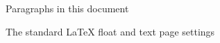 \documentclass[12pt]{article}
\begin{document}
\begin{preview}



\end{preview}


\begin{preview}



\end{preview}


\begin{preview}



\end{preview}


\begin{preview}
    


\end{preview}

\begin{preview}
	
	\currentparagraph
	\begin{figure}
		\paragraphdesign
		\caption{Paragraphs in this document}\label{fig:dpara}
	\end{figure}
	
\end{preview}

\begin{preview}
	
	\begin{figure}
		\currentfloatpage
		\floatpagedesign
		\caption{The standard \LaTeX{} float and text page settings}
		\label{fig:fpstd}
	\end{figure}

	
\end{preview}
\end{document}
